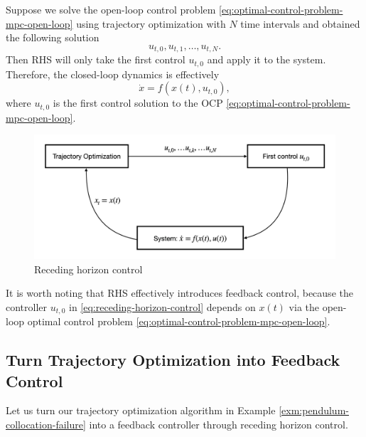 \documentclass[
]{book}
\theoremstyle{definition}
\theoremstyle{definition}
\theoremstyle{definition}
\theoremstyle{definition}
\theoremstyle{remark}
\begin{document}
Suppose we solve the open-loop control problem \eqref{eq:optimal-control-problem-mpc-open-loop} using trajectory optimization with \(N\) time intervals and obtained the following solution
\[
u_{t,0},u_{t,1},\dots,u_{t,N}.
\]
Then RHS will only take the first control \(u_{t,0}\) and apply it to the system. Therefore, the closed-loop dynamics is effectively
\begin{equation}
\dot{x} = f(x(t),u_{t,0}),
\label{eq:receding-horizon-control}
\end{equation}
where \(u_{t,0}\) is the first control solution to the OCP \eqref{eq:optimal-control-problem-mpc-open-loop}.

\begin{figure}

{\centering \includegraphics[width=0.8\linewidth]{images/receding_horizon_control} 

}

\caption{Receding horizon control}\label{fig:receding-horizon-control}
\end{figure}

It is worth noting that RHS effectively introduces feedback control, because the controller \(u_{t,0}\) in \eqref{eq:receding-horizon-control} depends on \(x(t)\) via the open-loop optimal control problem \eqref{eq:optimal-control-problem-mpc-open-loop}.

\hypertarget{turn-trajectory-optimization-into-feedback-control}{%
\subsection{Turn Trajectory Optimization into Feedback Control}\label{turn-trajectory-optimization-into-feedback-control}}

Let us turn our trajectory optimization algorithm in Example \ref{exm:pendulum-collocation-failure} into a feedback controller through receding horizon control.
\end{document}
